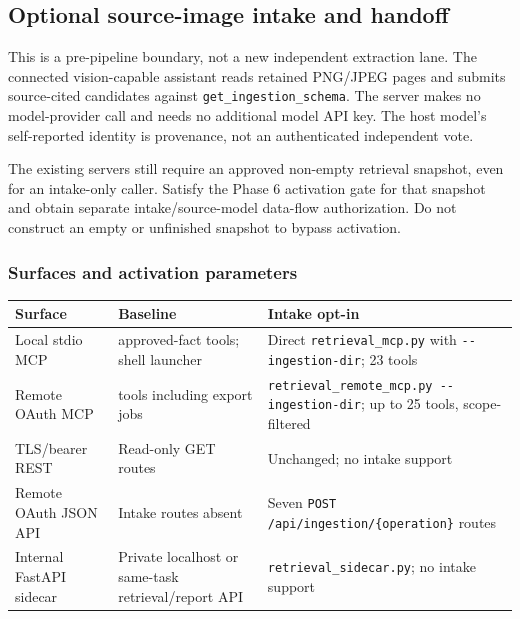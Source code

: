 \documentclass[
]{article}
\newcounter{none} %
\begin{document}
\subsection{Optional source-image intake and
handoff}\label{optional-source-image-intake-and-handoff}

This is a pre-pipeline boundary, not a new independent extraction lane.
The connected vision-capable assistant reads retained PNG/JPEG pages and
submits source-cited candidates against
\texttt{get\_\allowbreak{}ingestion\_\allowbreak{}schema}. The server
makes no model-provider call and needs no additional model API key. The
host model's self-reported identity is provenance, not an authenticated
independent vote.

The existing servers still require an approved non-empty retrieval
snapshot, even for an intake-only caller. Satisfy the Phase 6 activation
gate for that snapshot and obtain separate intake/source-model data-flow
authorization. Do not construct an empty or unfinished snapshot to
bypass activation.

\subsubsection{Surfaces and activation
parameters}\label{surfaces-and-activation-parameters}

{\def\LTcaptype{none} %
\begin{longtable}[]{@{}
  >{\raggedright\arraybackslash}p{}
  >{\raggedright\arraybackslash}p{}
  >{\raggedright\arraybackslash}p{}@{}}
\toprule\noalign{}
\begin{minipage}[b]{\linewidth}\raggedright
Surface
\end{minipage} & \begin{minipage}[b]{\linewidth}\raggedright
Baseline
\end{minipage} & \begin{minipage}[b]{\linewidth}\raggedright
Intake opt-in
\end{minipage} \\
\midrule\noalign{}
\endhead
\bottomrule\noalign{}
\endlastfoot
Local stdio MCP & 12 approved-fact tools; shell launcher & Direct
\texttt{retrieval\_\allowbreak{}mcp.py} with \texttt{-\/-ingestion-dir};
23 tools \\
Remote OAuth MCP & 14 tools including export jobs &
\texttt{retrieval\_\allowbreak{}remote\_\allowbreak{}mcp.py -\allowbreak{}-\allowbreak{}ingestion-\allowbreak{}dir};
up to 25 tools, scope-filtered \\
TLS/bearer REST & Read-only GET routes & Unchanged; no intake support \\
Remote OAuth JSON API & Intake routes absent & Seven
\texttt{POST /\allowbreak{}api/\allowbreak{}ingestion/\allowbreak{}\{operation\}}
routes \\
Internal FastAPI sidecar & Private localhost or same-task
retrieval/report API & \texttt{retrieval\_\allowbreak{}sidecar.py}; no
intake support \\
\end{longtable}
}
\end{document}
